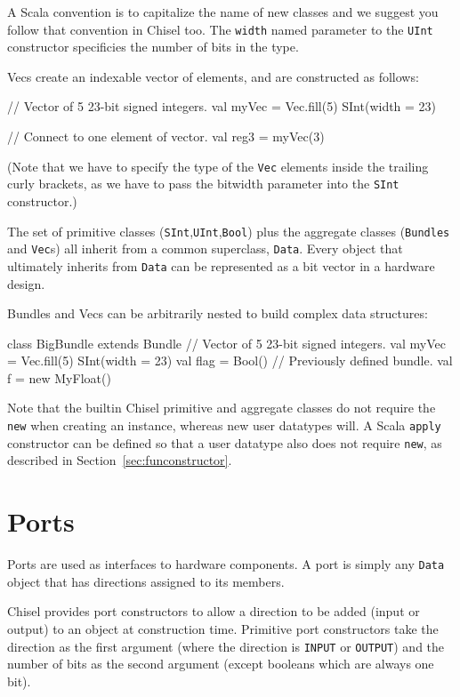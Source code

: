 \documentclass[twocolumn,10pt]{article}
\def\code#1{{\tt #1}}
\begin{document}
\noindent
A Scala convention is to capitalize the name of new classes and we
suggest you follow that convention in Chisel too.  The \code{width}
named parameter to the \code{UInt} constructor specificies the number
of bits in the type.

Vecs create an indexable vector of elements, and are constructed as
follows:
\begin{scala}
// Vector of 5 23-bit signed integers.
val myVec = Vec.fill(5){ SInt(width = 23) } 

// Connect to one element of vector. 
val reg3  = myVec(3) 
\end{scala}

\noindent
(Note that we have to specify the type of the \code{Vec} elements
inside the trailing curly brackets, as we have to pass the bitwidth
parameter into the \code{SInt} constructor.)

The set of primitive classes
(\code{SInt},\code{UInt},\code{Bool}) plus the aggregate
classes (\code{Bundles} and \code{Vec}s) all inherit from a common
superclass, \code{Data}.  Every object that ultimately inherits from
\code{Data} can be represented as a bit vector in a hardware design.

Bundles and Vecs can be arbitrarily nested to build complex data
structures:
\begin{scala}
class BigBundle extends Bundle {
 // Vector of 5 23-bit signed integers.
 val myVec = Vec.fill(5) { SInt(width = 23) } 
 val flag  = Bool()
 // Previously defined bundle.
 val f     = new MyFloat()              
}
\end{scala}

\noindent
Note that the builtin Chisel primitive and aggregate classes do not
require the \code{new} when creating an instance, whereas new user
datatypes will.  A Scala \code{apply} constructor can be defined so
that a user datatype also does not require \code{new}, as described in
Section~\ref{sec:funconstructor}.

\section{Ports}

Ports are used as interfaces to hardware components.  A port is simply
any \code{Data} object that has directions assigned to its members.

Chisel provides port constructors to allow a direction to be added
(input or output) to an object at construction time.  Primitive port
constructors take the direction as the first
argument (where the direction is \code{INPUT} or
\code{OUTPUT}) and the number of bits as the second argument (except
booleans which are always one bit).
\end{document}
